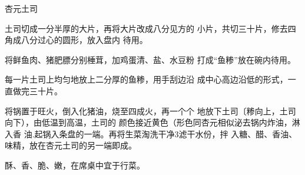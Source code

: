 \begin{recipe}{杏元土司}

\ingredients


\cooking

\step 土司切成一分半厚的大片，再将大片改成八分见方的 小片，共切三十片，修去四角成八分过心的圆形，放入盘内 待用。

\step 将鲜鱼肉、猪肥膘分别棰茸，加鸡蛋清、盐、水豆粉 打成“鱼糁”放在碗内待用。

\step 每一片土司上均匀地放上二分厚的鱼糁，用手刮边沿 成中心高边沿低的形式，一直做完三十片。

\step 将锅置于旺火，倒入化猪油，烧至四成火，再一个个 地放下土司〔糁向上，土司向下），由低温到高温，土司的 颜色接近黄色（形色同杏元相似泌去锅内炸油，淋入香 油.起锅入条盘的一端。再将生菜淘洗干净3滤干水份，拌 入糖、醋、香油、味精，放在杏元土司的另一端即成。

\notes

酥、香、脆、嫩，在席桌中宜于行菜。

\end{recipe}

